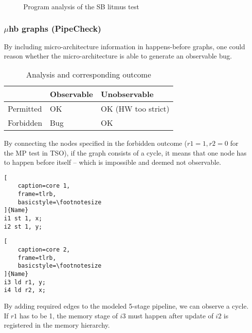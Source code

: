 \documentclass{article}
\begin{document}
\begin{multicols*}{2}
\begin{figure}[H]
  \caption{Program analysis of the SB litmus test}
\end{figure}

\subsubsection{$\mu$hb graphs (PipeCheck)}
By including micro-architecture information in happens-before graphs, one could reason whether the micro-architecture is able to generate an observable bug.

\begin{table}[H]
\begin{tabular}{|l|l|l|}
\hline
          & Observable & Unobservable       \\ \hline\hline
Permitted & OK         & OK (HW too strict) \\ \hline
Forbidden & Bug        & OK                 \\ \hline
\end{tabular}
\caption{Analysis and corresponding outcome}
\end{table}

By connecting the nodes specified in the forbidden outcome ($r1=1, r2=0$ for the MP test in TSO), if the graph consists of a cycle, it means that one node has to happen before itself -- which is impossible and deemed not observable.

\noindent\begin{minipage}{.2\textwidth}
\captionsetup{labelformat=empty}
\begin{lstlisting}[
    caption=core 1,
    frame=tlrb, 
    basicstyle=\footnotesize
]{Name}
i1 st 1, x;
i2 st 1, y;
\end{lstlisting}
\end{minipage}\hfill
\begin{minipage}{.2\textwidth}
\captionsetup{labelformat=empty}
\begin{lstlisting}[
    caption=core 2,
    frame=tlrb,
    basicstyle=\footnotesize
]{Name}
i3 ld r1, y;
i4 ld r2, x;
\end{lstlisting}
\end{minipage}

\noindent\newline
By adding required edges to the modeled 5-stage pipeline, we can observe a cycle. If $r1$ has to be 1, the memory stage of $i3$ must happen after update of $i2$ is registered in the memory hierarchy.


\end{multicols*}
\end{document}
